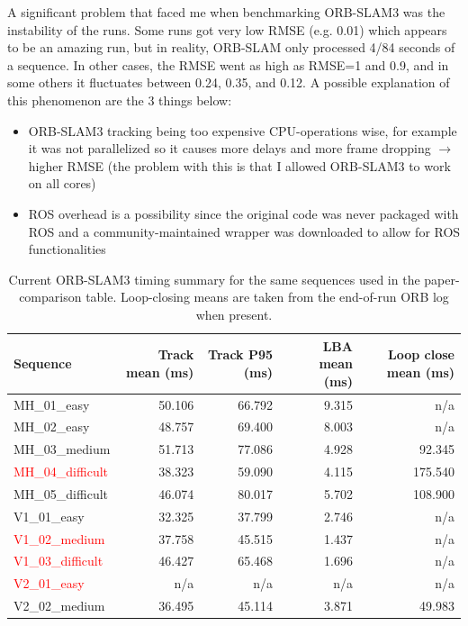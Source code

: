 \documentclass[11pt]{article}
\begin{document}
A significant problem that faced me when benchmarking ORB-SLAM3 was the instability of the runs. Some runs got very low RMSE (e.g. 0.01) which appears to be an amazing run, but in reality, ORB-SLAM only processed 4/84 seconds of a sequence. In other cases, the RMSE went as high as RMSE=1 and 0.9, and in some others it fluctuates between 0.24, 0.35, and 0.12. A possible explanation of this phenomenon are the 3 things below:
\begin{itemize}
    \item ORB-SLAM3 tracking being too expensive CPU-operations wise, for example it was not parallelized so it causes more delays and more frame dropping $\to$ higher RMSE (the problem with this is that I allowed ORB-SLAM3 to work on all cores) 
    \item ROS overhead is a possibility since the original code was never packaged with ROS and a community-maintained wrapper was downloaded to allow for ROS functionalities
\end{itemize}

\begin{table}[H]
\centering
\small
\caption{Current ORB-SLAM3 timing summary for the same sequences used in the paper-comparison table. Loop-closing means are taken from the end-of-run ORB log when present.}
\label{tab:orb_vs_paper_timing}
\begin{tabular}{lrrrr}
\toprule
Sequence & Track mean (ms) & Track P95 (ms) & LBA mean (ms) & Loop close mean (ms) \\
\midrule
MH\_01\_easy & 50.106 & 66.792 & 9.315 & n/a \\
MH\_02\_easy & 48.757 & 69.400 & 8.003 & n/a \\
MH\_03\_medium & 51.713 & 77.086 & 4.928 & 92.345 \\
\textcolor{red}{MH\_04\_difficult} & 38.323 & 59.090 & 4.115 & 175.540 \\
MH\_05\_difficult & 46.074 & 80.017 & 5.702 & 108.900 \\
V1\_01\_easy & 32.325 & 37.799 & 2.746 & n/a \\
\textcolor{red}{V1\_02\_medium} & 37.758 & 45.515 & 1.437 & n/a \\
\textcolor{red}{V1\_03\_difficult} & 46.427 & 65.468 & 1.696 & n/a \\
\textcolor{red}{V2\_01\_easy} & n/a & n/a & n/a & n/a \\
V2\_02\_medium & 36.495 & 45.114 & 3.871 & 49.983 \\
\bottomrule
\end{tabular}
\end{table}
\end{document}
